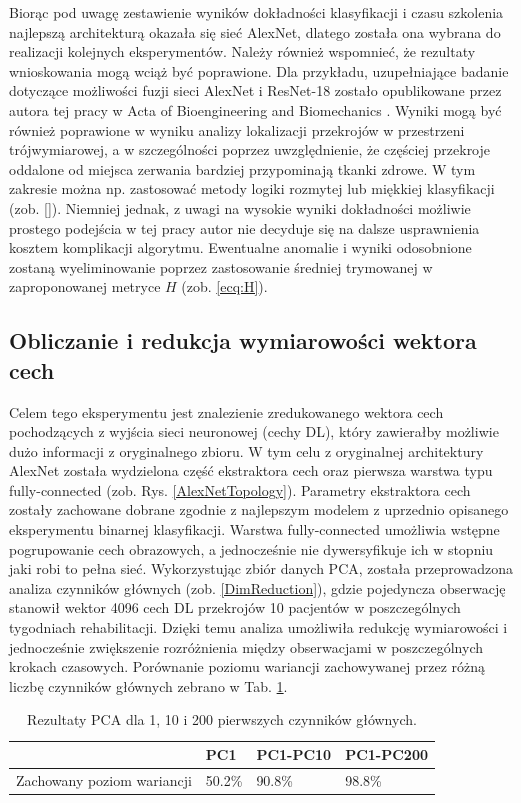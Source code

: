 Biorąc pod uwagę zestawienie wyników dokładności klasyfikacji i czasu szkolenia najlepszą architekturą okazała się sieć AlexNet, dlatego została ona wybrana do realizacji kolejnych eksperymentów. Należy również wspomnieć, że rezultaty wnioskowania mogą wciąż być poprawione. Dla przykładu, uzupełniające badanie dotyczące możliwości fuzji sieci AlexNet i ResNet-18 zostało opublikowane przez autora tej pracy w Acta of Bioengineering and Biomechanics \cite{Kapinski19}. Wyniki mogą być również poprawione w wyniku analizy lokalizacji przekrojów w przestrzeni trójwymiarowej, a w szczególności poprzez uwzględnienie, że częściej przekroje oddalone od miejsca zerwania bardziej przypominają tkanki zdrowe. W tym zakresie można np. zastosować metody logiki rozmytej lub miękkiej klasyfikacji (zob. []). Niemniej jednak, z uwagi na wysokie wyniki dokładności możliwie prostego podejścia w tej pracy autor nie decyduje się na dalsze usprawnienia kosztem komplikacji algorytmu. Ewentualne anomalie i wyniki odosobnione zostaną wyeliminowanie poprzez zastosowanie średniej trymowanej w zaproponowanej metryce $H$ (zob. \ref{ecq:H}).

\subsection{Obliczanie i redukcja wymiarowości wektora cech}

Celem tego eksperymentu jest znalezienie zredukowanego wektora cech pochodzących z wyjścia sieci neuronowej (cechy DL), który zawierałby możliwie dużo informacji z oryginalnego zbioru. W tym celu z oryginalnej architektury AlexNet została wydzielona część ekstraktora cech oraz pierwsza warstwa typu fully-connected (zob. Rys. \ref{AlexNetTopology}). Parametry ekstraktora cech zostały zachowane dobrane zgodnie z najlepszym modelem z uprzednio opisanego eksperymentu binarnej klasyfikacji. Warstwa fully-connected umożliwia wstępne pogrupowanie cech obrazowych, a jednocześnie nie dywersyfikuje ich w stopniu jaki robi to pełna sieć. Wykorzystując zbiór danych PCA, została przeprowadzona analiza czynników głównych (zob. \ref{DimReduction}), gdzie pojedyncza obserwację stanowił wektor 4096 cech DL przekrojów 10 pacjentów w poszczególnych tygodniach rehabilitacji. Dzięki temu analiza umożliwiła redukcję wymiarowości i jednocześnie zwiększenie rozróżnienia między obserwacjami w poszczególnych krokach czasowych. Porównanie poziomu wariancji zachowywanej przez różną liczbę czynników głównych zebrano w Tab. \ref{PCA-results}.
\begin{table}[h!]
 \setlength{\tabcolsep}{12pt}
 \centering
 \caption{Rezultaty PCA dla 1, 10 i 200 pierwszych czynników głównych.}
 \label{PCA-results}
 \begin{tabular}{l|l|l|l}
 \hline
 & PC1 & PC1-PC10 & PC1-PC200 \\ \hline
 Zachowany poziom wariancji & 50.2\% & 90.8\%   & 98.8\% \\ \hline 
 \end{tabular}
 \end{table}

